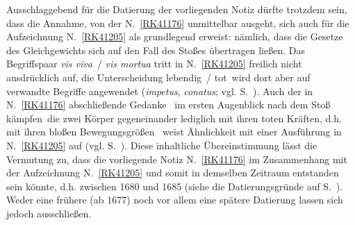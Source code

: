 \begin{ledgroup}
\pend%
%
\pstart%
Ausschlaggebend für die Datierung der vorliegenden Notiz dürfte trotzdem sein, dass die Annahme, von der N.~\ref{RK41176} unmittelbar ausgeht, sich auch für die Aufzeichnung N.~\ref{RK41205} als grundlegend erweist: nämlich, dass die Gesetze des Gleichgewichts sich auf den Fall des Stoßes übertragen ließen.
Das Begriffspaar \textit{vis viva}~/ \textit{vis mortua} tritt in N.~\ref{RK41205} freilich nicht ausdrücklich auf, die Unterscheidung \glqq lebendig~/ tot\grqq\ wird dort aber auf verwandte Begriffe angewendet (\textit{impetus}, \textit{conatus}; vgl. S.~).
Auch der in N.~\ref{RK41176} abschließende Gedanke \textendash\ im ersten Augenblick nach dem Stoß \glqq kämpfen\grqq\ die zwei Körper gegeneinander lediglich mit ihren toten Kräften, d.h. mit ihren bloßen Bewegungsgrößen \textendash\ weist Ähnlichkeit mit einer Ausführung in N.~\ref{RK41205} auf (vgl. S.~).
Diese inhaltliche Übereinstimmung lässt die Vermutung zu, dass die vorliegende Notiz N.~\ref{RK41176} im Zusammenhang mit der Aufzeichnung N.~\ref{RK41205} und somit in demselben Zeitraum entstanden sein könnte, d.h. zwischen 1680 und 1685 (siehe die Datierungsgründe auf S.~\pageref{LH_35_09_21_007_Datierung}).
Weder eine frühere (ab 1677) noch vor allem eine spätere Datierung lassen sich jedoch ausschließen.%
\pend%
%

\end{ledgroup}
